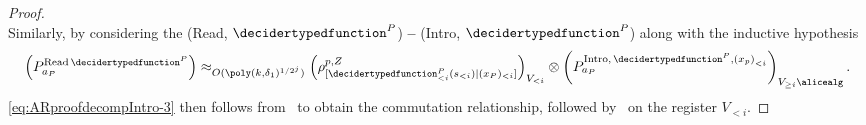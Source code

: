 \begin{proof}
\begin{equation*}
	\end{equation*}
	Similarly, by considering the  (Read, $\decidertypedfunction^P$) \textbf{--}  (Intro, $\decidertypedfunction^P$) along with the inductive hypothesis
	\begin{equation}
		\left(P^{\text{Read} \, \decidertypedfunction^P}_{a_P} \right) \approx_{O(\poly(k, \delta_1)^{1/2^j})} \left(\rho^{p,Z}_{[\decidertypedfunction^P_{< i}(s_{< i})|(x_P)_{< i} ]}\right)_{V_{< i}} \otimes \left(P^{\text{Intro}, \, \decidertypedfunction^P, \left(x_p\right)_{< i}}_{a_P} \right)_{V_{\geq i} \alicealg}.
	\end{equation}	
	\eqref{eq:ARproofdecompIntro-3} then follows from~ to obtain the commutation relationship, followed by~ on the register $V_{< i}$.
	

\end{proof}
